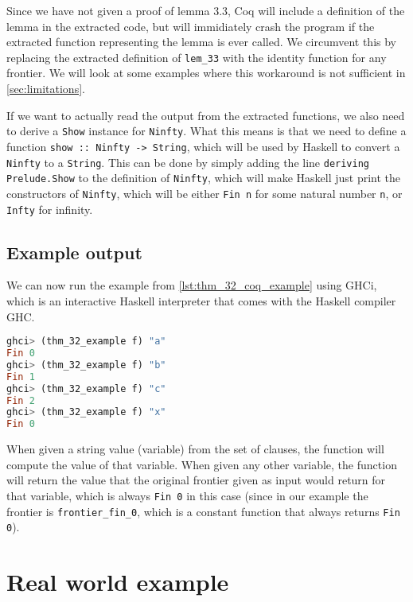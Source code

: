 Since we have not given a proof of lemma 3.3, Coq will include a definition of the lemma in the extracted code,
but will immidiately crash the program if the extracted function representing the lemma is ever called.
We circumvent this by replacing the extracted definition of \lstinline{lem_33} with the identity function
for any frontier. We will look at some examples where this workaround is not sufficient in
\autoref{sec:limitations}.

If we want to actually read the output from the extracted functions, we also need to
derive a \lstinline{Show} instance for \lstinline{Ninfty}.
What this means is that we need to define a function \lstinline{show :: Ninfty -> String},
which will be used by Haskell to convert a \lstinline{Ninfty} to a \lstinline{String}.
This can be done by simply adding the line \lstinline{deriving Prelude.Show} to the definition of \lstinline{Ninfty},
which will make Haskell just print the constructors of \lstinline{Ninfty},
which will be either \lstinline{Fin n} for some natural number \lstinline{n},
or \lstinline{Infty} for infinity.

\subsection{Example output}

We can now run the example from \autoref{lst:thm_32_coq_example} using GHCi,
which is an interactive Haskell interpreter that comes with the Haskell compiler GHC.

\begin{minipage}{\linewidth}
\begin{lstlisting}[language=Haskell, label={lst:thm_32_haskell_output}, caption={\lstinline{thm_32} example output}]
ghci> (thm_32_example f) "a"
Fin 0
ghci> (thm_32_example f) "b"
Fin 1
ghci> (thm_32_example f) "c"
Fin 2
ghci> (thm_32_example f) "x"
Fin 0
\end{lstlisting}
\end{minipage}

When given a string value (variable) from the set of clauses, the function will compute the value of that variable.
When given any other variable, the function will return the value that the original frontier given as input
would return for that variable, which is always \lstinline{Fin 0} in this case
(since in our example the frontier is \lstinline{frontier_fin_0},
which is a constant function that always returns \lstinline{Fin 0}).

\section{Real world example}

